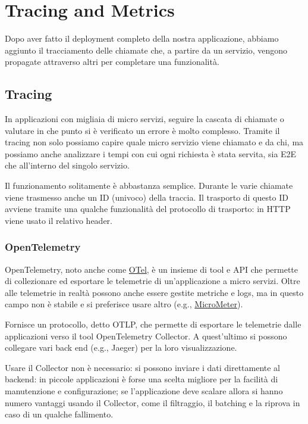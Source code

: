 \chapter{Tracing and Metrics}
Dopo aver fatto il deployment completo della nostra applicazione, abbiamo aggiunto il tracciamento delle chiamate che, a partire da un servizio, vengono propagate attraverso altri per completare una funzionalità.

\section{Tracing}
In applicazioni con migliaia di micro servizi, seguire la cascata di chiamate o valutare in che punto si è verificato un errore è molto complesso. Tramite il tracing non solo possiamo capire quale micro servizio viene chiamato e da chi, ma possiamo anche analizzare i tempi con cui ogni richiesta è stata servita, sia E2E che all'interno del singolo servizio.

\myskip

Il funzionamento solitamente è abbastanza semplice. Durante le varie chiamate viene trasmesso anche un ID (univoco) della traccia. Il trasporto di questo ID avviene tramite una qualche funzionalità del protocollo di trasporto: in HTTP viene usato il relativo header.

\subsection{OpenTelemetry}
OpenTelemetry, noto anche come \href{https://opentelemetry.io}{OTel}, è un insieme di tool e API che permette di collezionare ed esportare le telemetrie di un'applicazione a micro servizi. Oltre alle telemetrie in realtà possono anche essere gestite metriche e logs, ma in questo campo non è stabile e si preferisce usare altro (e.g., \href{https://micrometer.io}{MicroMeter}).

\myskip

Fornisce un protocollo, detto OTLP, che permette di esportare le telemetrie dalle applicazioni verso il tool OpenTelemetry Collector. A quest'ultimo si possono collegare vari back end (e.g., Jaeger) per la loro visualizzazione.

Usare il Collector non è necessario: si possono inviare i dati direttamente al backend: in piccole applicazioni è forse una scelta migliore per la facilità di manutenzione e configurazione; se l'applicazione deve scalare allora si hanno numero vantaggi usando il Collector, come il filtraggio, il batching e la riprova in caso di un qualche fallimento.


